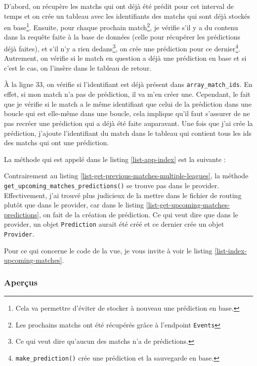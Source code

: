 \documentclass[a4paper,14pt]{extarticle}
\begin{document}
{D'abord, on récupère les matchs qui ont déjà été prédit pour cet interval de temps et on crée un tableau avec les identifiants des matchs qui sont déjà stockés en base\footnote{Cela va permettre d'éviter de stocker à nouveau une prédiction en base.}. Ensuite, pour chaque prochain match\footnote{Les prochains matchs ont été récupérés grâce à l'endpoint \texttt{Events}}, je vérifie s'il y a du contenu dans la requête faite à la base de données (celle pour récupérer les prédictions déjà faites), et s'il n'y a rien dedans\footnote{Ce qui veut dire qu'aucun des matchs n'a de prédictions.}, on crée une prédiction pour ce dernier\footnote{\texttt{make\_prediction()} crée une prédiction et la sauvegarde en base.}. Autrement, on vérifie si le match en question a déjà une prédiction en base et si c'est le cas, on l'insère dans le tableau de retour.

À la ligne 33, on vérifie si l'identifiant est déjà présent dans \texttt{array\_match\_ids}. En effet, si mon match n'a pas de prédiction, il va m'en créer une. Cependant, le fait que je vérifie si le match a le même identifiant que celui de la prédiction dans une boucle qui est elle-même dans une boucle, cela implique qu'il faut s'assurer de ne pas recréer une prédiction qui a déjà été faite auparavant. Une fois que j'ai crée la prédiction, j'ajoute l'identifiant du match dans le tableau qui contient tous les ids des matchs qui ont une prédiction.

La méthode qui est appelé dans le listing \ref{list-app-index} est la suivante :


Contrairement au listing \ref{list-get-previous-matches-multiple-leagues}, la méthode \texttt{get\_upcoming\_matches\_predictions()} se trouve pas dans le provider. Effectivement, j'ai trouvé plus judicieux de la mettre dans le fichier de routing plutôt que dans le provider, car dans le listing \ref{list-get-upcoming-matches-predictions}, on fait de la création de prédiction. Ce qui veut dire que dans le provider, un objet \texttt{Prediction} aurait été créé et ce dernier crée un objet \texttt{Provider}. 
 
Pour ce qui concerne le code de la vue, je vous invite à voir le listing \ref{list-index-upcoming-matches}.


\subsubsection{Aperçus}

}
\end{document}
